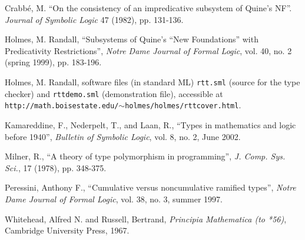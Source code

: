 \documentclass{article}
\begin{document}
{\footnotesize

\begin{thebibliography}{99}



 Crabb\'e, M.  ``On the consistency of an
impredicative subsystem of Quine's NF''.  {\em Journal of Symbolic
Logic\/} 47 (1982), pp. 131-136.

 Holmes, M. Randall, ``Subsystems of Quine's ``New
Foundations'' with Predicativity Restrictions'', {\em Notre Dame
Journal of Formal Logic\/}, vol. 40, no. 2 (spring 1999), pp. 183-196.

 Holmes, M. Randall, software files (in standard ML)
{\tt rtt.sml} (source for the type checker) and {\tt rttdemo.sml}
(demonstration file), accessible at {\tt
http://math.boisestate.edu/$\sim$holmes/holmes/rttcover.html}.

 Kamareddine, F., Nederpelt, T., and Laan, R., ``Types in mathematics and
logic before 1940'', {\em Bulletin of Symbolic Logic\/}, vol. 8,
no. 2, June 2002.


 Milner, R., ``A theory of type polymorphism in
programming'', {\em J. Comp. Sys. Sci.\/}, 17 (1978), pp. 348-375.

 Peressini, Anthony F., ``Cumulative versus
noncumulative ramified types'', {\em Notre Dame Journal of Formal
Logic\/}, vol. 38, no. 3, summer 1997.


 Whitehead, Alfred N. and Russell, Bertrand, {\em
Principia Mathematica (to *56)\/}, Cambridge University Press, 1967.

\end{thebibliography}
}
\end{document}
